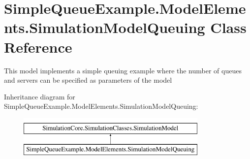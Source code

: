 \hypertarget{class_simple_queue_example_1_1_model_elements_1_1_simulation_model_queuing}{}\section{Simple\+Queue\+Example.\+Model\+Elements.\+Simulation\+Model\+Queuing Class Reference}
\label{class_simple_queue_example_1_1_model_elements_1_1_simulation_model_queuing}


This model implements a simple queuing example where the number of queues and servers can be specified as parameters of the model  


Inheritance diagram for Simple\+Queue\+Example.\+Model\+Elements.\+Simulation\+Model\+Queuing\+:\begin{figure}[H]
\begin{center}
\leavevmode
\includegraphics[height=2.000000cm]{class_simple_queue_example_1_1_model_elements_1_1_simulation_model_queuing}
\end{center}
\end{figure}
